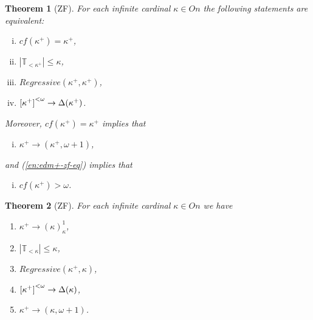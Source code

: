 \documentclass[a4paper,10pt,reqno]{amsart}
\numberwithin{equation}{section}
\newtheorem{theorem}{Theorem}[section]
\theoremstyle{definition}
\theoremstyle{remark}
\newcommand{\mbb}[1]{\mathbb{#1}}
\begin{document}
\begin{theorem}[ZF]\label{tm:equivalence-in-ZF}
    For each infinite cardinal ${\kappa}\in On$ the following statements are equivalent:
    \begin{enumerate}[(i)]
        \item \label{en:cof-zf-eq} $cf({\kappa}^+)= {\kappa}^+$,  
        \item \label{en:tree-zf-eq}     $|\mbb T_{<{{\kappa}^+}}|\le {\kappa}$, %
        \item \label{en:reg-zf-eq} $Regressive({\kappa}^+,{\kappa}^+)$, %
        \item \label{en:delta-zf-eq} ${[{\kappa}^+]}^{<{\omega}}\to \Delta({\kappa}^+)$. %
    \end{enumerate}
    Moreover, $cf({\kappa}^+)= {\kappa}^+$ implies that 
    \begin{enumerate}[(i)]\addtocounter{enumi}{4}
        \item \label{en:edm+-zf-eq} ${\kappa}^+\to ({\kappa}^+,{\omega}+1)$,
    \end{enumerate}
    and (\ref{en:edm+-zf-eq}) implies that     
    \begin{enumerate}[(i)]\addtocounter{enumi}{5}
        \item \label{en:cofom-zf-eq} $cf({\kappa}^+)>{\omega}$.
    \end{enumerate}
    \end{theorem}
    

    \begin{theorem}[ZF]\label{tm:elementary-in-ZF}
        For each infinite cardinal ${\kappa}\in On$ we have 
        \begin{enumerate}[(1)]
        \item \label{en:cof-zf}$ {\kappa}^+\to ({\kappa})^1_{\kappa}$, %
        \item \label{en:tree-zf}     $|\mbb T_{<{{\kappa}}}|\le {\kappa}$, %
        \item \label{en:reg-zf} $Regressive({\kappa}^+,{\kappa})$, %
        \item \label{en:delta-zf} ${[{\kappa}^+]}^{<{\omega}}\to \Delta({\kappa})$, %
        \item \label{en:edm+-zf} ${\kappa}^+\to ({\kappa},{\omega}+1)$.
        \end{enumerate}
        \end{theorem}
\end{document}
